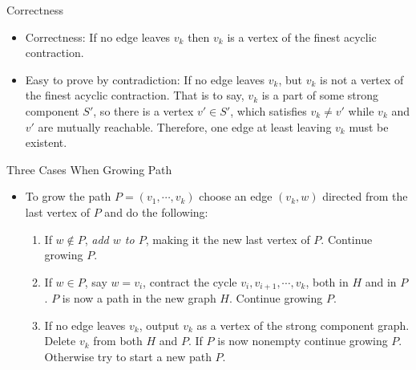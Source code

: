 \documentclass{beamer}
\begin{document}
\begin{frame}{Correctness}
	\begin{itemize}
		\item
		Correctness: If no edge leaves $v_k$ then $v_k$ is a vertex of the finest acyclic contraction.
		\item
		Easy to prove by contradiction: If no edge leaves $v_k$, but $v_k$ is not a vertex of the finest acyclic contraction.
		That is to say, $v_k$ is a part of some strong component $S'$, so there is a vertex $v'\in S'$, which satisfies $v_k\neq v'$
		while $v_k$ and $v'$ are mutually reachable. Therefore, one edge at least leaving $v_k$ must be existent.
	\end{itemize}
\end{frame}

\begin{frame}{Three Cases When Growing Path}
	\begin{itemize}
		\item
		To grow the path $P=(v_1,\cdots ,v_k)$ choose an edge $(v_k,w)$ directed from the last
		vertex of $P$ and do the following:
		\begin{enumerate}
			\item
			If $w\notin P$, \emph{add $w$ to $P$}, making it the new last vertex of $P$. Continue growing $P$.
			\item
			If $w\in P$, say $w=v_i$, contract the cycle $v_i, v_{i+1}, \cdots, v_k$, both in $H$
			and in $P$. $P$ is now a path in the new graph $H$. Continue growing $P$.
			\item
			If no edge leaves $v_k$, output $v_k$ as a vertex of the strong component graph. Delete $v_k$
			from both $H$ and $P$. If $P$ is now nonempty continue growing $P$. Otherwise try to start a
			new path $P$.
		\end{enumerate}
	\end{itemize}
\end{frame}
\end{document}

